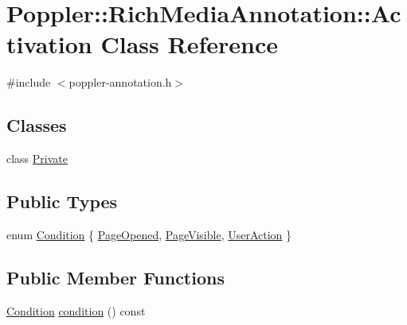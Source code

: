 \hypertarget{class_poppler_1_1_rich_media_annotation_1_1_activation}{}\section{Poppler\+:\+:Rich\+Media\+Annotation\+:\+:Activation Class Reference}
\label{class_poppler_1_1_rich_media_annotation_1_1_activation}


{\ttfamily \#include $<$poppler-\/annotation.\+h$>$}

\subsection*{Classes}
\begin{DoxyCompactItemize}
\item 
class \hyperlink{class_poppler_1_1_rich_media_annotation_1_1_activation_1_1_private}{Private}
\end{DoxyCompactItemize}
\subsection*{Public Types}
\begin{DoxyCompactItemize}
\item 
enum \hyperlink{class_poppler_1_1_rich_media_annotation_1_1_activation_a6bd1a04f2b4b84df639ba04ea08b5f85}{Condition} \{ \hyperlink{class_poppler_1_1_rich_media_annotation_1_1_activation_a6bd1a04f2b4b84df639ba04ea08b5f85ab9dd686c8450235ee41c068509dc77a4}{Page\+Opened}, 
\hyperlink{class_poppler_1_1_rich_media_annotation_1_1_activation_a6bd1a04f2b4b84df639ba04ea08b5f85ab9a29a18bc6936678503d0582370e820}{Page\+Visible}, 
\hyperlink{class_poppler_1_1_rich_media_annotation_1_1_activation_a6bd1a04f2b4b84df639ba04ea08b5f85aeb73eaacfd8116b861c7fd62f812bdac}{User\+Action}
 \}
\end{DoxyCompactItemize}
\subsection*{Public Member Functions}
\begin{DoxyCompactItemize}
\item 
\hyperlink{class_poppler_1_1_rich_media_annotation_1_1_activation_a6bd1a04f2b4b84df639ba04ea08b5f85}{Condition} \hyperlink{class_poppler_1_1_rich_media_annotation_1_1_activation_aa783ac044437a650e664eebf391af1ae}{condition} () const
\end{DoxyCompactItemize}
